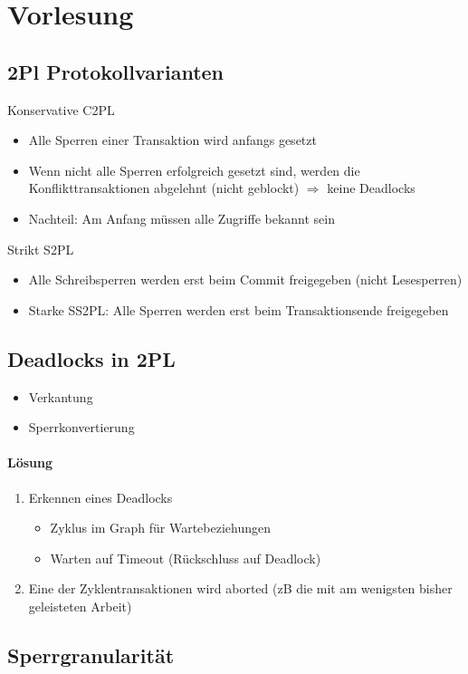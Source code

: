 \documentclass[ngerman]{scrartcl}
\begin{document}
\section{Vorlesung}
\subsection{2Pl Protokollvarianten}
Konservative C2PL
\begin{itemize}
  \item Alle Sperren einer Transaktion wird anfangs gesetzt
  \item Wenn nicht alle Sperren erfolgreich gesetzt sind, werden die Konflikttransaktionen abgelehnt (nicht geblockt) $ \Rightarrow $ keine Deadlocks
  \item Nachteil: Am Anfang müssen alle Zugriffe bekannt sein
\end{itemize}
Strikt S2PL
\begin{itemize}
  \item Alle Schreibsperren werden erst beim Commit freigegeben (nicht Lesesperren)
  \item Starke SS2PL: Alle Sperren werden erst beim Transaktionsende freigegeben
\end{itemize}

\subsection{Deadlocks in 2PL}
\begin{itemize}
  \item Verkantung
  \item Sperrkonvertierung
\end{itemize}
\paragraph{Lösung}
\begin{enumerate}
  \item Erkennen eines Deadlocks
  \begin{itemize}
    \item Zyklus im Graph für Wartebeziehungen
    \item Warten auf Timeout (Rückschluss auf Deadlock)
  \end{itemize}
  \item Eine der Zyklentransaktionen wird aborted (zB die mit am wenigsten bisher geleisteten Arbeit)
\end{enumerate}

\subsection{Sperrgranularität}
\end{document}
